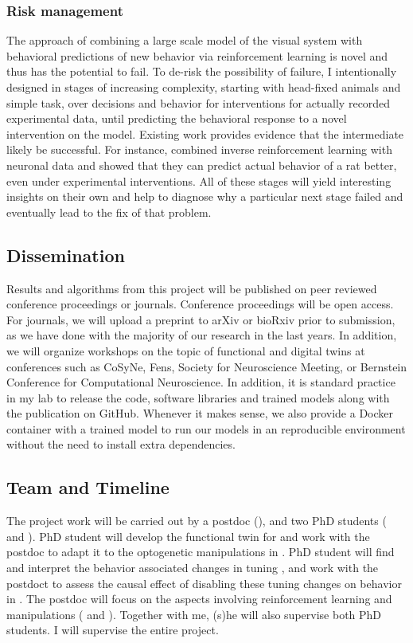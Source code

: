 \documentclass[B2,COG]{ercgrant}
\begin{document}
\subsubsection{Risk management} 
The approach of combining a large scale model of the visual system with behavioral predictions of new behavior via reinforcement learning is novel and thus has the potential to fail. 
To de-risk the possibility of failure, I intentionally designed  in stages of increasing complexity, starting with head-fixed animals and simple task, over decisions and behavior for interventions for actually recorded experimental data, until predicting the behavioral response to a novel intervention on the model. 
Existing work provides evidence that the intermediate likely be successful.  
For instance, \textcite{Kalweit2022-ev} combined inverse reinforcement learning with neuronal data and showed that they can predict actual behavior of a rat better, even under experimental interventions. 
All of these stages will yield interesting insights on their own and help to diagnose why a particular next stage failed and eventually lead to the fix of that problem. 

\subsection{Dissemination}
Results and algorithms from this project will be published on peer reviewed conference proceedings or journals. 
Conference proceedings will be open access.
For journals, we will upload a preprint to arXiv or bioRxiv prior to submission, as we have done with the majority of our research in the last years. 
In addition, we will organize workshops on the topic of functional and digital twins at conferences such as CoSyNe, Fens, Society for Neuroscience Meeting, or Bernstein Conference for Computational Neuroscience.
In addition, it is standard practice in my lab to release the code, software libraries and trained models along with the publication on GitHub.
Whenever it makes sense, we also provide a Docker container with a trained model to run our models in an reproducible environment without the need to install extra dependencies. 

\subsection{Team and Timeline}
The project work will be carried out by a postdoc (), and two PhD students ( and ). 
PhD student  will develop the functional twin for  and work with the postdoc to adapt it to the optogenetic manipulations in .
PhD student  will find and interpret the behavior associated changes in tuning , and work with the postdoct to assess the causal effect of disabling these tuning changes on behavior in .
The postdoc  will focus on the aspects involving reinforcement learning and manipulations ( and ). 
Together with me, (s)he will also supervise both PhD students.
I will supervise the entire project.
\end{document}
